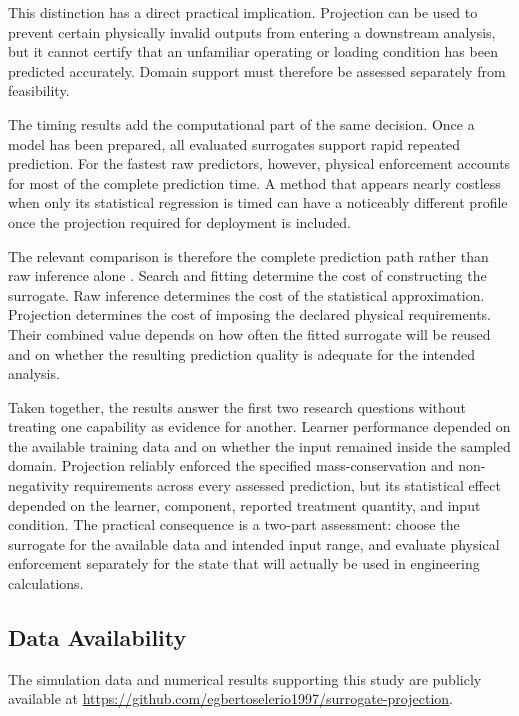 This distinction has a direct practical implication. Projection can be used to prevent certain physically invalid outputs from entering a downstream analysis, but it cannot certify that an unfamiliar operating or loading condition has been predicted accurately. Domain support must therefore be assessed separately from feasibility.

The timing results add the computational part of the same decision. Once a model has been prepared, all evaluated surrogates support rapid repeated prediction. For the fastest raw predictors, however, physical enforcement accounts for most of the complete prediction time. A method that appears nearly costless when only its statistical regression is timed can have a noticeably different profile once the projection required for deployment is included.

The relevant comparison is therefore the complete prediction path rather than raw inference alone \citep{BhosekarIerapetritou2018,Bliek2023}. Search and fitting determine the cost of constructing the surrogate. Raw inference determines the cost of the statistical approximation. Projection determines the cost of imposing the declared physical requirements. Their combined value depends on how often the fitted surrogate will be reused and on whether the resulting prediction quality is adequate for the intended analysis.

Taken together, the results answer the first two research questions without treating one capability as evidence for another. Learner performance depended on the available training data and on whether the input remained inside the sampled domain. Projection reliably enforced the specified mass-conservation and non-negativity requirements across every assessed prediction, but its statistical effect depended on the learner, component, reported treatment quantity, and input condition. The practical consequence is a two-part assessment: choose the surrogate for the available data and intended input range, and evaluate physical enforcement separately for the state that will actually be used in engineering calculations.

\subsection{Data Availability}
\label{sec:projection_data_availability}

The simulation data and numerical results supporting this study are publicly available at \url{https://github.com/egbertoselerio1997/surrogate-projection}.